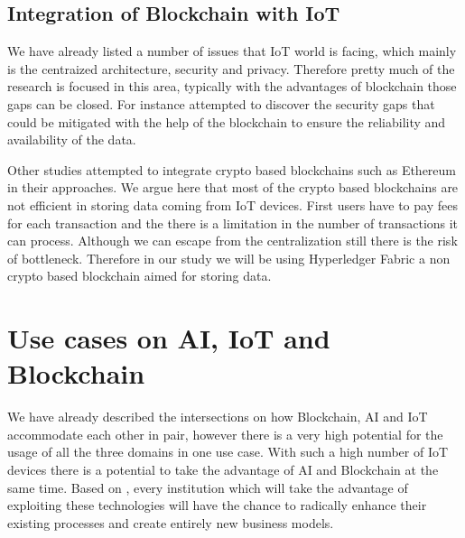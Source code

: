 \subsection{Integration of Blockchain with IoT}

We have already listed a number of issues that IoT world is facing, which mainly is the centraized architecture, security and privacy. Therefore pretty much of the research is focused in this area, typically with the advantages of blockchain those gaps can be closed. For instance \cite{inbook223ris} attempted to discover the security gaps that could be mitigated with the help of the blockchain to ensure the reliability and availability of the data.

Other studies \cite{8598784} attempted to integrate crypto based blockchains such as Ethereum in their approaches. We argue here that most of the crypto based blockchains are not efficient in storing data coming from IoT devices. First users have to pay fees for each transaction and the there is a limitation in the number of transactions it can process. Although we can escape from the centralization still there is the risk of bottleneck. Therefore in our study we will be using Hyperledger Fabric a non crypto based blockchain aimed for storing data. 

































 
 
 
 \section{Use cases on AI, IoT and Blockchain}
 
 We have already described the intersections on how Blockchain, AI and IoT accommodate each other in pair, however there is a very high potential for the usage of all the three domains in one use case. With such a high number of IoT devices there is a potential to take the advantage of AI and Blockchain at the same time. Based on \cite{oracle}, every institution  which will take the advantage of exploiting these technologies will have the chance to radically enhance their existing processes and create entirely new business models. 
 
